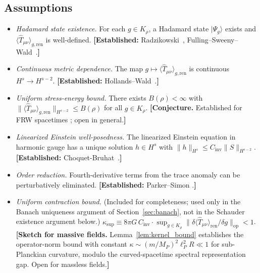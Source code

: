 \documentclass[12pt,a4paper]{article}
\begin{document}
\subsection{Assumptions}

\begin{itemize}
\item[\textbf{(A1)}] \textit{Hadamard state existence.} For each $g\in K_\rho$, a
Hadamard state $|\Psi_g\rangle$ exists and $\langle\hat{T}_{\mu\nu}\rangle_{g,\text{ren}}$
is well-defined. \textbf{[Established:} Radzikowski~\cite{radzikowski},
Fulling--Sweeny--Wald~\cite{fulling_sweeny_wald}.\textbf{]}

\item[\textbf{(A2)}] \textit{Continuous metric dependence.} The map $g\mapsto
\langle\hat{T}_{\mu\nu}\rangle_{g,\text{ren}}$ is continuous $H^s\to H^{s-2}$.
\textbf{[Established:} Hollands--Wald~\cite{hollands_wald_wick}.\textbf{]}

\item[\textbf{(A3)}] \textit{Uniform stress-energy bound.} There exists $B(\rho)<\infty$
with $\|\langle\hat{T}_{\mu\nu}\rangle_{g,\text{ren}}\|_{H^{s-2}} \leq B(\rho)$ for all
$g\in K_\rho$. \textbf{[Conjecture.} Established for FRW spacetimes
\cite{pinamonti_siemssen}; open in general.\textbf{]}

\item[\textbf{(A4)}] \textit{Linearized Einstein well-posedness.} The linearized Einstein
equation in harmonic gauge has a unique solution $h\in H^s$ with
$\|h\|_{H^s} \leq C_{\text{inv}}\|S\|_{H^{s-2}}$.
\textbf{[Established:} Choquet-Bruhat~\cite{choquet_bruhat}.\textbf{]}

\item[\textbf{(A5)}] \textit{Order reduction.} Fourth-derivative terms from the trace
anomaly can be perturbatively eliminated. \textbf{[Established:} Parker--Simon
\cite{parker_simon}.\textbf{]}

\item[\textbf{(A6)}] \textit{Uniform contraction bound.}
(Included for completeness; used only in the Banach uniqueness argument of Section~\ref{sec:banach}, not in the Schauder existence argument below.)\newline
$\kappa_{\sup} \equiv 8\pi G\,C_{\text{inv}}\cdot\sup_{g\in K_\rho}\|\delta\langle\hat{T}_{\mu\nu}\rangle_{\text{ren}}/\delta g\|_{\text{op}} < 1$.
\textbf{[Sketch for massive fields.} Lemma~\ref{lem:kernel_bound} establishes the
operator-norm bound with constant $\kappa \sim (m/M_P)^2\ell_P^2 R \ll 1$ for
sub-Planckian curvature, modulo the curved-spacetime spectral representation
gap. Open for massless fields.\textbf{]}
\end{itemize}
\end{document}
